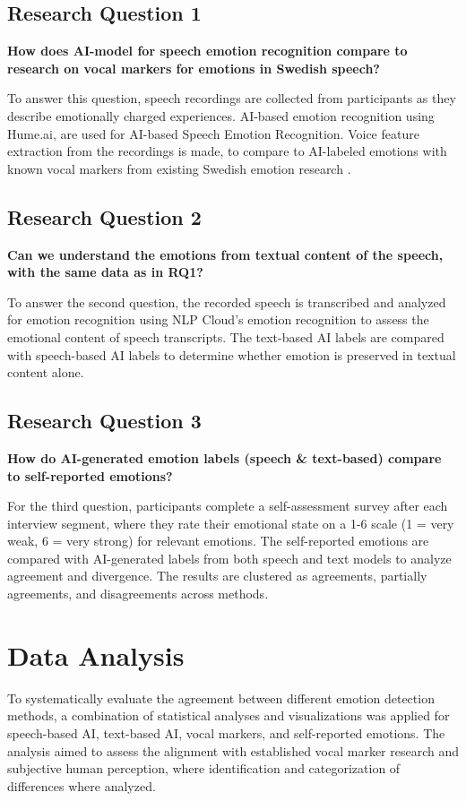 \subsection{Research Question 1}
\textbf{How does AI-model for speech emotion recognition compare to research on vocal markers for emotions in Swedish speech?}

To answer this question, speech recordings are collected from participants as they describe emotionally charged experiences. AI-based emotion recognition using Hume.ai, are used for AI-based Speech Emotion Recognition. Voice feature extraction from the recordings is made, to compare to AI-labeled emotions with known vocal markers from existing Swedish emotion research \autocite{Ekberg2023}. 

\subsection{Research Question 2}
\textbf{Can we understand the emotions from textual content of the speech, with the same data as in RQ1? }

To answer the second question, the recorded speech is transcribed and analyzed for emotion recognition using NLP Cloud’s emotion recognition to assess the emotional content of speech transcripts. The text-based AI labels are compared with speech-based AI labels to determine whether emotion is preserved in textual content alone. 

\subsection{Research Question 3}
\textbf{How do AI-generated emotion labels (speech \& text-based) compare to self-reported emotions? }

For the third question, participants complete a self-assessment survey after each interview segment, where they rate their emotional state on a 1-6 scale (1 = very weak, 6 = very strong) for relevant emotions. The self-reported emotions are compared with AI-generated labels from both speech and text models to analyze agreement and divergence. The results are clustered as agreements, partially agreements, and disagreements across methods. 


\section{Data Analysis}
To systematically evaluate the agreement between different emotion detection methods, a combination of statistical analyses and visualizations was applied for speech-based AI, text-based AI, vocal markers, and self-reported emotions. 
The analysis aimed to assess the alignment with established vocal marker research and subjective human perception, where identification and categorization of differences where analyzed. 

